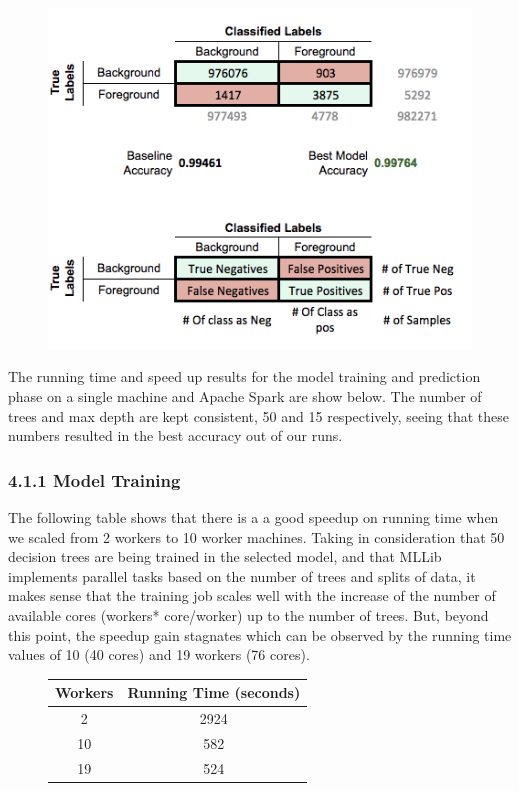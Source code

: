 \documentclass{neu_handout}
\begin{document}
\begin{center}
\begin{figure}[!h]
\centering
  \includegraphics[width=0.5\linewidth]{confusionmatrix}
  \label{fig:confusionmatrix}
\end{figure}
\end{center}

The running time and speed up results for the model training and prediction phase on a single machine and Apache Spark are show below. The number of trees and max depth are kept consistent, 50 and 15 respectively, seeing that these numbers resulted in the best accuracy out of our runs.

\subsubsection*{4.1.1 Model Training}

The following table shows that there is a a good speedup on running time when we scaled from 2 workers to 10 worker machines. Taking in consideration that 50 decision trees are being trained in the selected model, and that MLLib implements parallel tasks based on the number of trees and splits of data, it makes sense that the training job scales well with the increase of the number of available cores (workers* core/worker) up to the number of trees. But, beyond this point, the speedup gain stagnates which can be observed by the running time values of 10 (40 cores) and 19  workers (76 cores). 

\begin{figure}[!htb]
\begin{center}
 \begin{tabular}{||c c ||}
 \hline
Workers & Running Time (seconds) \\ [0.5ex] 
 \hline\hline
  2 & 2924  \\ 
  \hline
 10 & 582  \\ 
  \hline
 19 & 524  \\ [1ex] 
 \hline
\end{tabular}
\end{center}
\end{figure}
\end{document}
